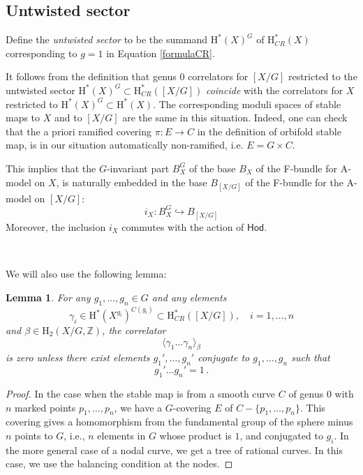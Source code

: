\documentclass[12pt,a4paper]{amsart}
\newtheorem{lemma}[theorem]{Lemma}
\theoremstyle{definition}
\theoremstyle{remark}
\newcommand{\Z}{\mathbb{Z}}
\newcommand{\rH}{\mathrm{H}}
\begin{document}
\subsection{Untwisted sector} 



Define the \textit{untwisted sector} to be the summand $\rH^\ast(X)^G$ of $\rH_{CR}^\ast(X)$ corresponding to $g=1$ in Equation \eqref{formulaCR}. 


It follows from the definition that genus $0$ correlators for $[X/G]$ restricted to the untwisted sector $\rH^\ast(X)^G\subset \rH_{CR}^\ast([X/G])$ \textit{coincide} with the correlators for $X$ restricted to $\rH^\ast(X)^G\subset \rH^\ast(X)$. The corresponding moduli spaces of stable maps to $X$ and to $[X/G]$ are the same in this situation. Indeed, one can check that the a priori ramified covering $\pi:E\to C$ in the definition of orbifold stable map, is in our situation automatically non-ramified, i.e. $E=G\times C$.

This implies that the $G$-invariant part $B_X^G$ of the base $B_X$ of the F-bundle for A-model on $X$, is naturally embedded in the base $B_{[X/G]}$ of the F-bundle for the A-model on $[X/G]$:
\begin{equation}
    i_X:B_X^G\hookrightarrow B_{[X/G]}
\end{equation}
Moreover, the inclusion $i_X$ commutes with the action of $\mathsf{Hod}$.

\ 

We will also use the following lemma:
\begin{lemma}
    For any $g_1,\dots,g_n\in G$
    and any elements
    $$\gamma_i\in \rH^\ast(X^{g_i})^{C(g_i)}\subset \rH^\ast_{CR}([X/G]),\quad i=1,\dots, n$$
   and $\beta\in \rH_2(X/G,\Z)$, the correlator 
    $$\langle \gamma_1\dots\gamma_n\rangle_\beta$$
    is zero unless there exist elements
     $g_1',\dots, g_n'$ conjugate to $g_1,\dots, g_n$ such that
      $$g_1'\dots g_n'=1\,.$$
    \label{lmm:product_constraint}
\end{lemma}
\begin{proof} In the case when the stable map is from a smooth curve $C$ of genus $0$ with $n$ marked points $p_1,\dots,p_n$, we have a $G$-covering $E$ of $C-\{p_1,\dots,p_n\}$. This covering gives a homomorphism from the fundamental group of the sphere minus $n$ points to $G$, i.e., $n$ elements in $G$ whose product is $1$, and conjugated to $g_i$. In the more general case of a nodal curve, we get a tree of rational curves. In this case, we use the balancing condition at the nodes.
\end{proof}
\end{document}
